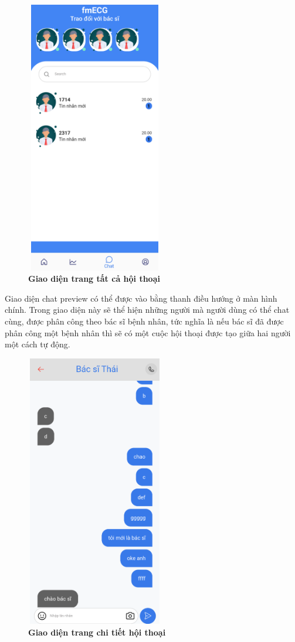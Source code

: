 \begin{figure}[H]
  \centering
  \includegraphics[width=6cm,height=12cm]{Images/mobile_app/demo/chat_preview.png}
  \caption[Giao diện trang tất cả hội thoại]{\bfseries \fontsize{12pt}{0pt}\selectfont Giao diện trang tất cả hội thoại}
  \label{demo_chat_preview}
\end{figure}

Giao diện chat preview có thể được vào bằng thanh điều hướng ở màn hình chính. Trong giao diện này sẽ thể hiện những người
mà người dùng có thể chat cùng, được phân công theo bác sĩ bệnh nhân, tức nghĩa là nếu bác sĩ đã được phân công một bệnh nhân
thì sẽ có một cuộc hội thoại được tạo giữa hai người một cách tự động.

\begin{figure}[H]
  \centering
  \includegraphics[width=6cm,height=12cm]{Images/mobile_app/demo/chat_detail.png}
  \caption[Giao diện trang chi tiết hội thoại]{\bfseries \fontsize{12pt}{0pt}\selectfont Giao diện trang chi tiết hội thoại}
  \label{demo_chat_detail}
\end{figure}

